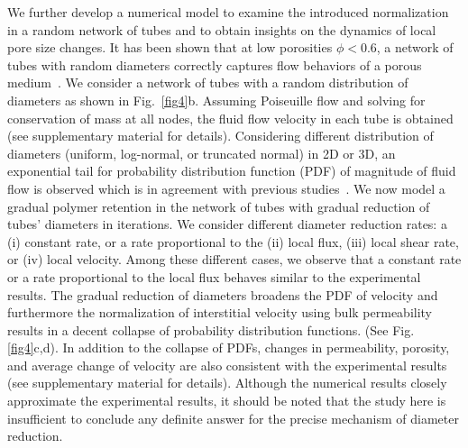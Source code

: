 We further develop a numerical model to examine the introduced normalization  in a random network of tubes and to obtain insights on the dynamics of local pore size changes.
It has been shown that at low porosities $\phi<0.6$, a network of tubes with random diameters correctly captures flow behaviors of a porous medium~\cite{alim2017local}. 
We consider a network of tubes with a random distribution of diameters  as shown in Fig.~\ref{fig4}b. Assuming Poiseuille flow and solving for conservation of mass at all nodes, the fluid flow velocity in each tube is obtained  (see supplementary material for details). Considering different distribution of diameters (uniform, log-normal, or truncated normal) in 2D or 3D, an exponential tail for probability distribution function (PDF) of magnitude of fluid flow is observed which is in agreement with previous studies~\cite{alim2017local}. We now model a gradual polymer retention in the network of tubes with gradual reduction of tubes' diameters in iterations. We consider different diameter reduction rates: a (i) constant rate, or a rate proportional to the (ii) local flux, (iii) local shear rate, or (iv) local velocity. Among these different cases, we observe that a constant rate or a rate proportional to the local flux behaves similar to the experimental results. The gradual reduction of diameters broadens the PDF of velocity and furthermore the normalization of interstitial velocity using bulk permeability results in a decent collapse of probability distribution functions. (See Fig. \ref{fig4}c,d). In addition to the collapse of PDFs, changes in permeability, porosity, and average change of velocity are also consistent with the experimental results (see supplementary material for details). Although the numerical results closely approximate the experimental results, it should be noted that  the study here is insufficient to conclude any definite answer for the precise mechanism of diameter reduction.

